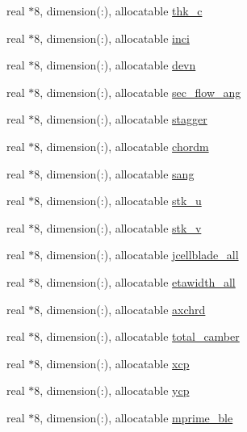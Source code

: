 \begin{DoxyCompactItemize}
\item 
real $\ast$8, dimension(\+:), allocatable \hyperlink{namespaceglobvar_a82469b82bd578f446472dd30088714f0}{thk\+\_\+c}
\item 
real $\ast$8, dimension(\+:), allocatable \hyperlink{namespaceglobvar_aa012253fe6b7a8b294e3e65bad3c31e8}{inci}
\item 
real $\ast$8, dimension(\+:), allocatable \hyperlink{namespaceglobvar_abfd9d4eb33cd8633c8aad2c1d7678bb2}{devn}
\item 
real $\ast$8, dimension(\+:), allocatable \hyperlink{namespaceglobvar_a208ad9b136524be1d4393b67f071b5eb}{sec\+\_\+flow\+\_\+ang}
\item 
real $\ast$8, dimension(\+:), allocatable \hyperlink{namespaceglobvar_adf510f84d1bfa9c2e369c105376b1009}{stagger}
\item 
real $\ast$8, dimension(\+:), allocatable \hyperlink{namespaceglobvar_aea4b21a5810c0b0a15759b11536d0a7e}{chordm}
\item 
real $\ast$8, dimension(\+:), allocatable \hyperlink{namespaceglobvar_a3f70e26ad6e5208ef5da2f77d96a7e55}{sang}
\item 
real $\ast$8, dimension(\+:), allocatable \hyperlink{namespaceglobvar_afbf780b139c39ff8db75247ee75175f6}{stk\+\_\+u}
\item 
real $\ast$8, dimension(\+:), allocatable \hyperlink{namespaceglobvar_a9d8a1cb2fc5fe27167d0e136347140cd}{stk\+\_\+v}
\item 
real $\ast$8, dimension(\+:), allocatable \hyperlink{namespaceglobvar_adecbf51d76538b4b226fcaa88b8d2c10}{jcellblade\+\_\+all}
\item 
real $\ast$8, dimension(\+:), allocatable \hyperlink{namespaceglobvar_af0124c85b1f11468ffb36b627963bf6a}{etawidth\+\_\+all}
\item 
real $\ast$8, dimension(\+:), allocatable \hyperlink{namespaceglobvar_aca0371a5b6c784a105a1c64ced0e28f5}{axchrd}
\item 
real $\ast$8, dimension(\+:), allocatable \hyperlink{namespaceglobvar_a69a510c5294264ed214fd28b3eb2c837}{total\+\_\+camber}
\item 
real $\ast$8, dimension(\+:), allocatable \hyperlink{namespaceglobvar_a2261b8999031669b2d4002de587e1017}{xcp}
\item 
real $\ast$8, dimension(\+:), allocatable \hyperlink{namespaceglobvar_aceb6425a62e3d2fa8d2f17f17d83e558}{ycp}
\item 
real $\ast$8, dimension(\+:), allocatable \hyperlink{namespaceglobvar_ae10e04d6629f2c844f1e0613142003da}{mprime\+\_\+ble}

\end{DoxyCompactItemize}
